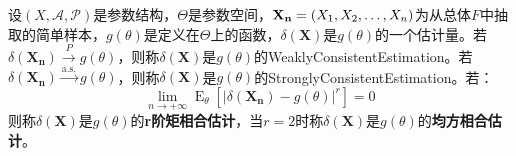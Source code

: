\begin{definition}
	设$(X,\mathscr{A},\mathscr{P})$是参数结构，$\Theta$是参数空间，$\mathbf{X_n}=(X_1, X_2, \dots, X_{n})$为从总体$F$中抽取的简单样本，$g(\theta)$是定义在$\Theta$上的函数，$\delta(\mathbf{X})$是$g(\theta)$的一个估计量。若$\delta(\mathbf{X_n})\overset{P}{\longrightarrow}g(\theta)$，则称$\delta(\mathbf{X})$是$g(\theta)$的\gls{WeaklyConsistentEstimation}。若$\delta(\mathbf{X_n})\overset{\text{a.s.}}{\longrightarrow}g(\theta)$，则称$\delta(\mathbf{X})$是$g(\theta)$的\gls{StronglyConsistentEstimation}。若：
	\begin{equation*}
		\lim_{n\to+\infty}\operatorname{E}_{\theta}[|\delta(\mathbf{X_n})-g(\theta)|^r]=0
	\end{equation*}
	则称$\delta(\mathbf{X})$是$g(\theta)$的\textbf{r阶矩相合估计}，当$r=2$时称$\delta(\mathbf{X})$是$g(\theta)$的\textbf{均方相合估计}。
\end{definition}





